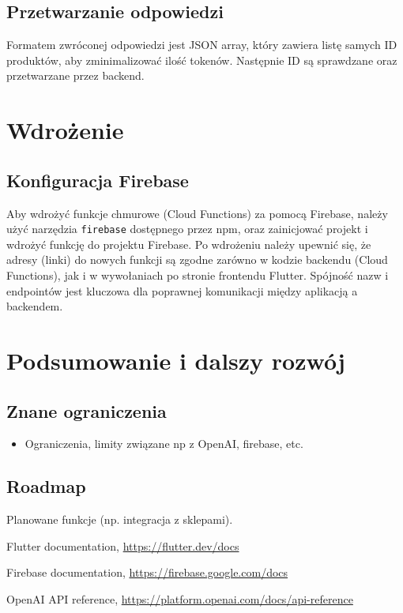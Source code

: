\documentclass[a4paper, 12pt]{article}
\begin{document}
\subsection{Przetwarzanie odpowiedzi}
Formatem zwróconej odpowiedzi jest JSON array, który zawiera listę samych ID produktów,
aby zminimalizować ilość tokenów. Następnie ID są sprawdzane oraz przetwarzane przez backend.

\section{Wdrożenie}
\subsection{Konfiguracja Firebase}
Aby wdrożyć funkcje chmurowe (Cloud Functions) za pomocą Firebase, należy użyć narzędzia \texttt{firebase} dostępnego przez npm, oraz zainicjować projekt i wdrożyć funkcję do projektu Firebase.
Po wdrożeniu należy upewnić się, że adresy (linki) do nowych funkcji są zgodne zarówno w kodzie backendu (Cloud Functions), jak i w wywołaniach po stronie frontendu Flutter. Spójność nazw i endpointów jest kluczowa dla poprawnej komunikacji między aplikacją a backendem.

\newpage
\section{Podsumowanie i dalszy rozwój}
\subsection{Znane ograniczenia}
\begin{itemize}
    \item Ograniczenia, limity związane np z OpenAI, firebase, etc.
\end{itemize}

\subsection{Roadmap}
Planowane funkcje (np. integracja z sklepami).

\begin{thebibliography}{9}
Flutter documentation, \url{https://flutter.dev/docs}

Firebase documentation, \url{https://firebase.google.com/docs}

OpenAI API reference, \url{https://platform.openai.com/docs/api-reference}
\end{thebibliography}
\end{document}
